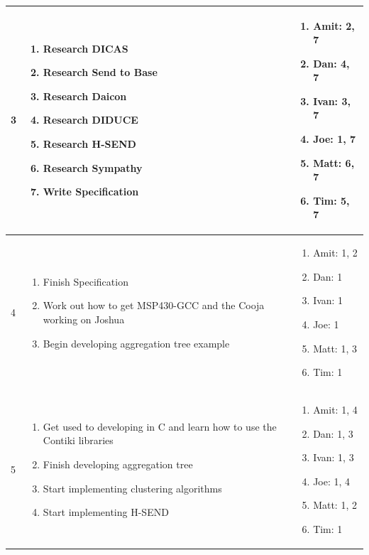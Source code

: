 \begin{center}
\begin{longtable}{| l | p{9cm} | p{3.5cm} |}
	3 & \begin{enumerate}
			\item Research DICAS
			\item Research Send to Base
			\item Research Daicon
			\item Research DIDUCE
			\item Research H-SEND
			\item Research Sympathy
			\item Write Specification
		\end{enumerate} &
	\begin{enumerate}
		\item[] Amit: 2, 7
		\item[] Dan: 4, 7
		\item[] Ivan: 3, 7
		\item[] Joe: 1, 7
		\item[] Matt: 6, 7
		\item[] Tim: 5, 7
	\end{enumerate}
	\\ \hline
	
	
	4 & \begin{enumerate}
			\item Finish Specification
			\item Work out how to get MSP430-GCC and the Cooja working on Joshua
			\item Begin developing aggregation tree example
		\end{enumerate} &
	\begin{enumerate}
		\item[] Amit: 1, 2
		\item[] Dan: 1
		\item[] Ivan: 1
		\item[] Joe: 1
		\item[] Matt: 1, 3
		\item[] Tim: 1
	\end{enumerate}
	\\ \hline
	
	
	5 & \begin{enumerate}
			\item Get used to developing in C and learn how to use the Contiki libraries
			\item Finish developing aggregation tree
			\item Start implementing clustering algorithms
			\item Start implementing H-SEND
		\end{enumerate} &
	\begin{enumerate}
		\item[] Amit: 1, 4
		\item[] Dan: 1, 3
		\item[] Ivan: 1, 3
		\item[] Joe: 1, 4
		\item[] Matt: 1, 2
		\item[] Tim: 1
	\end{enumerate}
	\\ \hline
	

\end{longtable}
\end{center}
